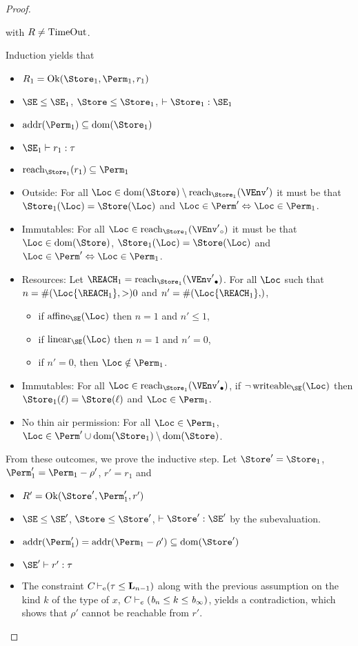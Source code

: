 \begin{proof}
\begin{itemize}
    with $R\ne \operatorname{TimeOut}$. 
  \end{itemize}
  Induction yields that
  \begin{itemize}
  \item
    $R_1 = \Ok{\Store_1, \Perm_1, r_1}$  
  \item $\SE \le \SE_1$, $\Store \le \Store_1$,
    $\vdash \Store_1 : \SE_1$ 
  \item $\Addresses{\Perm_1} \subseteq \Dom{\Store_1}$
  \item $\SE_1 \vdash r_1 : \tau$
  \item $\Reach{\Store_1}{r_1} \subseteq \Perm_1$
  \item Outside: For all $\Loc \in \Dom{\Store} \setminus
    \Reach{\Store_1}{\VEnv'}$ it must be that 
    $\Store_1 (\Loc) = \Store (\Loc)$
    and $\Loc\in\Perm' \Leftrightarrow \Loc\in\Perm_1$.
  \item Immutables: For all $\Loc \in
    \Reach{\Store_1}{\ImmutableBorrows{\VEnv'}}$ it must be that
    $\Loc\in\Dom\Store$, 
    $\Store_1 (\Loc) = \Store (\Loc)$
    and $\Loc\in\Perm' \Leftrightarrow \Loc\in\Perm_1$.
  \item Resources:
    Let $\REACH_1 =\Reach{\Store_1}{\Active{\VEnv'}}$.
    For all $\Loc$ such that $n= \MultiNumber\Loc{\REACH_1} >0$ and $n' =
    \MultiNumber\Loc{\REACH_1}$, 
    \begin{itemize}
    \item if $\Affine{\SE}\Loc$ then $n=1$ and $n'\le 1$,
    \item if $\Linear{\SE}\Loc$ then $n=1$ and $n' = 0$,
    \item if $n'=0$, then $\Loc\notin\Perm_1$.
    \end{itemize}
  \item Immutables: For all $\Loc \in \Reach
    {\Store_1}{\Active{\VEnv'}}$, if $\neg\Writeable{\SE}\Loc$ then
    $\Store_1 (\ell) = \Store (\ell)$ and $\Loc\in \Perm_1$.
  \item No thin air permission: For all $\Loc\in \Perm_1$, $\Loc
    \in \Perm' \cup  \Dom{\Store_1} \setminus \Dom{\Store}$.
  \end{itemize}
  From these outcomes, we prove the inductive step.
  Let $\Store' = \Store_1$, $\Perm_1' = \Perm_1-\rho'$, $r' = r_1$ and
  \begin{itemize}
  \item $R' = \Ok{\Store', \Perm_1', r'}$
  \item  $\SE \le \SE'$, $\Store \le \Store'$,
    $\vdash \Store' : \SE'$  by the subevaluation.
  \item $\Addresses{\Perm_1'} = \Addresses{\Perm_1-\rho'} \subseteq \Dom{\Store'}$
  \item $\SE' \vdash r' : \tau$
  \item The constraint $C \operatorname{\vdash_e} (\tau \leq \mathbf{L}_{n-1})$
    along with the previous assumption on the kind $k$ of the type of $x$,
    $C \vdash_e {(\textit{b}_n\leq k\leq\textit{b}_\infty)}$, yields a
    contradiction, which shows that $\rho'$ cannot be reachable from $r'$.


\end{itemize}
\end{proof}
